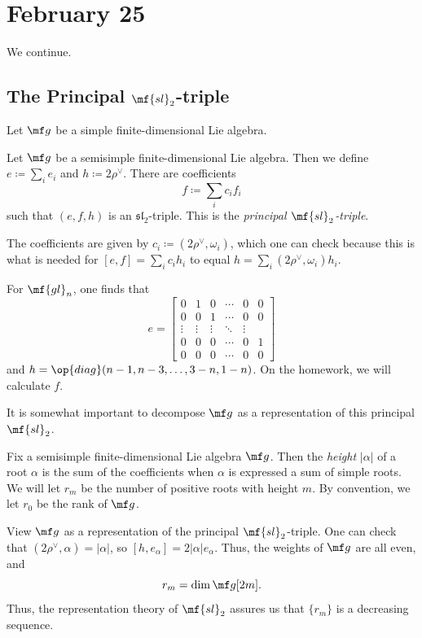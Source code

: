 \documentclass[../notes.tex]{subfiles}
\begin{document}
\section{February 25}
We continue.

\subsection{The Principal \texorpdfstring{$\mf{sl}_2$}{sl2}-triple}
Let $\mf g$ be a simple finite-dimensional Lie algebra.
\begin{definition}
	Let $\mf g$ be a semisimple finite-dimensional Lie algebra. Then we define $e\coloneqq\sum_ie_i$ and $h\coloneqq2\rho^\lor$. There are coefficients
	\[f\coloneqq\sum_ic_if_i\]
	such that $(e,f,h)$ is an $\mathfrak{sl}_2$-triple. This is the \textit{principal $\mf{sl}_2$-triple}.
\end{definition}
\begin{remark}
	The coefficients are given by $c_i\coloneqq(2\rho^\lor,\omega_i)$, which one can check because this is what is needed for $[e,f]=\sum_ic_ih_i$ to equal $h=\sum_i(2\rho^\lor,\omega_i)h_i$.
\end{remark}
\begin{example}
	For $\mf{gl}_n$, one finds that
	\[e=\begin{bmatrix}
		0 & 1 & 0 & \cdots & 0 & 0 \\
		0 & 0 & 1 & \cdots & 0 & 0 \\
		\vdots & \vdots & \vdots & \ddots & \vdots \\
		0 & 0 & 0 & \cdots & 0 & 1 \\
		0 & 0 & 0 & \cdots & 0 & 0
	\end{bmatrix}\]
	and $h=\op{diag}(n-1,n-3,\ldots,3-n,1-n)$. On the homework, we will calculate $f$.
\end{example}
It is somewhat important to decompose $\mf g$ as a representation of this principal $\mf{sl}_2$.
\begin{definition}[height]
	Fix a semisimple finite-dimensional Lie algebra $\mf g$. Then the \textit{height} $\left|\alpha\right|$ of a root $\alpha$ is the sum of the coefficients when $\alpha$ is expressed a sum of simple roots. We will let $r_m$ be the number of positive roots with height $m$. By convention, we let $r_0$ be the rank of $\mf g$.
\end{definition}
\begin{remark}
	View $\mf g$ as a representation of the principal $\mf{sl}_2$-triple. One can check that $(2\rho^\lor,\alpha)=\left|\alpha\right|$, so $[h,e_\alpha]=2\left|\alpha\right|e_\alpha$. Thus, the weights of $\mf g$ are all even, and
	\[r_m=\dim\mf g[2m].\]
	Thus, the representation theory of $\mf{sl}_2$ assures us that $\{r_m\}$ is a decreasing sequence.
\end{remark}
\end{document}
